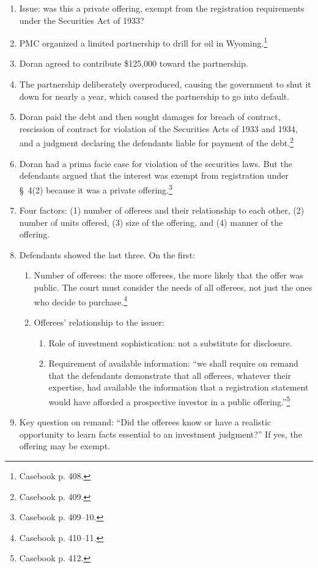 \begin{enumerate}
    \item Issue: was this a private offering, exempt from the registration 
    requirements under the Securities Act of 1933? 
    \item PMC organized a limited partnership to drill for oil in 
    Wyoming.\footnote{Casebook p. 408.}
    \item Doran agreed to contribute \$125,000 toward the partnership.
    \item The partnership deliberately overproduced, causing the government to 
    shut it down for nearly a year, which caused the partnership to go into 
    default.
    \item Doran paid the debt and then sought damages for breach of contract, 
    rescission of contract for violation of the Securities Acts of 1933 and 
    1934, and a judgment declaring the defendants liable for payment of the 
    debt.\footnote{Casebook p. 409.}
    \item Doran had a prima facie case for violation of the securities laws. But 
    the defendants argued that the interest was exempt from registration under 
    \S\ 4(2) because it was a private offering.\footnote{Casebook p. 409--10.}
    \item Four factors: (1) number of offerees and their relationship to each 
    other, (2) number of units offered, (3) size of the offering, and (4) manner 
    of the offering.
    \item Defendants showed the last three. On the first:
    \begin{enumerate}
        \item Number of offerees: the more offerees, the more likely that the 
        offer was public. The court must consider the needs of all offerees, not 
        just the ones who decide to purchase.\footnote{Casebook p. 410--11.}
        \item Offerees' relationship to the issuer:
        \begin{enumerate}
            \item Role of investment sophistication: not a substitute for 
            disclosure.
            \item Requirement of available information: ``we shall require on 
            remand that the defendants demonstrate that all offerees, whatever 
            their expertise, had available the information that a registration 
            statement would have afforded a prospective investor in a public 
            offering.''\footnote{Casebook p. 412.}
        \end{enumerate}
    \end{enumerate}
    \item Key question on remand: ``Did the offerees know or have a realistic 
    opportunity to learn facts essential to an investment judgment?'' If yes, 
    the offering may be exempt.
\end{enumerate}


